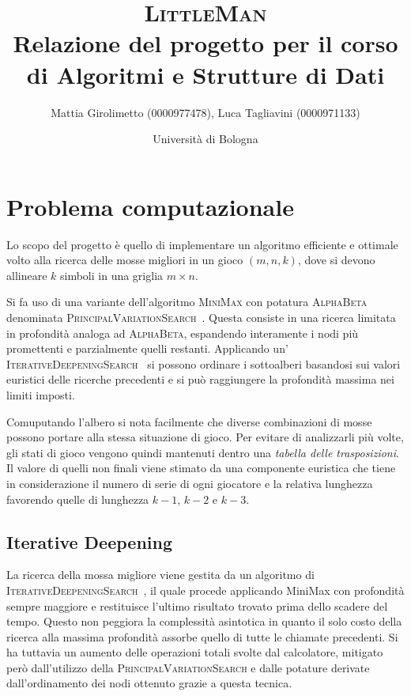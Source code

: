 \documentclass{article}
\title{\textsc{LittleMan}\\
\large Relazione del progetto per il corso di Algoritmi e Strutture di Dati}
\author{
  Mattia Girolimetto (0000977478),
  Luca Tagliavini (0000971133)
}
\date{
	Universit\`a di Bologna \\
  \displaydate{date}
}
\begin{document}
\maketitle

\section*{Problema computazionale}

Lo scopo del progetto \`e quello di implementare un algoritmo efficiente e ottimale
volto alla ricerca delle mosse migliori in un gioco $(m,n,k)$, dove si devono
allineare $k$ simboli in una griglia $m \times n$.

Si fa uso di una variante dell'algoritmo \textsc{MiniMax} con potatura
\textsc{AlphaBeta} denominata \textsc{PrincipalVariationSearch}~\cite{negascout}. Questa
consiste in una ricerca limitata in profondit\`a analoga ad \textsc{AlphaBeta}, espandendo 
interamente i nodi pi\`u promettenti e parzialmente quelli restanti. Applicando
un' \textsc{IterativeDeepeningSearch}~\cite{id} si possono ordinare i sottoalberi
basandosi sui valori euristici delle ricerche precedenti e si pu\`o raggiungere
la profondit\`a massima nei limiti imposti.

Comuputando l'albero si nota facilmente che diverse combinazioni di
mosse possono portare alla stessa situazione di gioco.
Per evitare di analizzarli pi\`u volte, gli stati di gioco vengono quindi mantenuti 
dentro una \emph{tabella delle trasposizioni}. Il valore di quelli non finali
viene stimato da una componente euristica che tiene in considerazione il numero
di serie di ogni giocatore e la relativa lunghezza favorendo quelle di lunghezza
$k-1$, $k-2$ e $k-3$.

\subsection*{Iterative Deepening}

La ricerca della mossa migliore viene gestita da un algoritmo di
\textsc{IterativeDeepeningSearch}~\cite{id}, il quale procede applicando MiniMax %
con profondit\`a sempre maggiore e restituisce l'ultimo risultato trovato prima dello
scadere del tempo. Questo non peggiora la complessit\`a asintotica in quanto il
solo costo della ricerca alla massima profondit\`a assorbe quello di tutte
le chiamate precedenti. Si ha tuttavia un aumento delle operazioni totali svolte
dal calcolatore, mitigato per\`o dall'utilizzo della \textsc{PrincipalVariationSearch} 
e dalle potature derivate dall'ordinamento dei nodi ottenuto grazie a questa tecnica.
\end{document}
